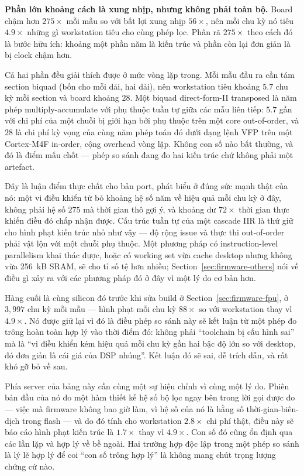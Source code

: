 \documentclass[11pt]{article}
\begin{document}
\textbf{Phần lớn khoảng cách là xung nhịp, nhưng không phải toàn bộ.}
Board chậm hơn $275\times$ mỗi mẫu so với bất lợi xung nhịp $56\times$,
nên mỗi chu kỳ nó tiêu $4.9\times$ những gì workstation tiêu cho cùng
phép lọc. Phân rã $275\times$ theo cách đó là bước hữu ích: khoảng một
phần năm là kiến trúc và phần còn lại đơn giản là bị clock chậm hơn.

Cả hai phần đều giải thích được ở mức vòng lặp trong. Mỗi mẫu đầu ra cần
tám section biquad (bốn cho mỗi dải, hai dải), nên workstation tiêu
khoảng $5.7$ chu kỳ mỗi section và board khoảng $28$. Một biquad
direct-form-II transposed là năm phép multiply-accumulate với phụ thuộc
tuần tự giữa các mẫu liên tiếp: $5.7$ gần với chi phí của một chuỗi bị
giới hạn bởi phụ thuộc trên một core out-of-order, và $28$ là chi phí kỳ
vọng của cùng năm phép toán đó dưới dạng lệnh VFP trên một Cortex-M4F
in-order, cộng overhead vòng lặp. Không con số nào bất thường, và đó là
điểm mấu chốt --- phép so sánh đang đo hai kiến trúc chứ không phải một
artefact.

Đây là luận điểm thực chất cho bản port, phát biểu ở đúng sức mạnh thật
của nó: một vi điều khiển từ bỏ khoảng hệ số năm về hiệu quả mỗi chu kỳ
ở đây, không phải hệ số $275$ mà thời gian thô gợi ý, và khoảng dư
$72\times$ thời gian thực khiến điều đó chấp nhận được. Cấu trúc tuần tự
của một cascade IIR là thứ giữ cho hình phạt kiến trúc nhỏ như vậy --- độ
rộng issue và thực thi out-of-order phải vật lộn với một chuỗi phụ thuộc.
Một phương pháp có instruction-level parallelism khai thác được, hoặc có
working set vừa cache desktop nhưng không vừa 256~kB SRAM, sẽ cho tỉ số
tệ hơn nhiều; Section~\ref{sec:firmware-others} nói về điều gì xảy ra với
các phương pháp đó ở đây vì một lý do cơ bản hơn.

Hàng cuối là cùng silicon đó trước khi sửa build ở
Section~\ref{sec:firmware-fpu}, ở $3{,}997$ chu kỳ mỗi mẫu --- hình phạt
mỗi chu kỳ $88\times$ so với workstation thay vì $4.9\times$. Nó được giữ
lại vì đó là điều phép so sánh này sẽ kết luận từ một phép đo trông hoàn
toàn hợp lý vào thời điểm đó: không phải ``toolchain bị cấu hình sai'' mà
là ``vi điều khiển kém hiệu quả mỗi chu kỳ gần hai bậc độ lớn so với
desktop, đó đơn giản là cái giá của DSP nhúng''. Kết luận đó sẽ sai, dễ
trích dẫn, và rất khó gỡ bỏ về sau.

Phía server của bảng này cần cùng một sự hiệu chỉnh vì cùng một lý do.
Phiên bản đầu của nó đo một hàm thiết kế hệ số bộ lọc ngay bên trong lời
gọi được đo --- việc mà firmware không bao giờ làm, vì hệ số của nó là
hằng số thời-gian-biên-dịch trong flash --- và do đó tính cho workstation
$2.8\times$ chi phí thật, điều này sẽ báo cáo hình phạt kiến trúc là
$1.7\times$ thay vì $4.9\times$. Con số đó cũng ổn định qua các lần lặp
và hợp lý về bề ngoài. Hai trường hợp độc lập trong một phép so sánh là
lý lẽ hợp lý để coi ``con số trông hợp lý'' là không mang chút trọng
lượng chứng cứ nào.
\end{document}
